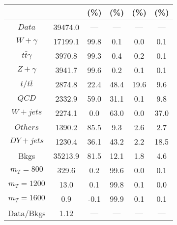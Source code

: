 \begin{figure}
\begin{minipage}[c]{0.32\textwidth}
{\begin{tabular}{cccccc}
 &  & (\%) & (\%) & (\%) & (\%)  \\
\hline
                                                                      $ Data $ &  39474.0 &  --- &  --- &  --- &  ---\\
$ W+\gamma $ &  17199.1 &  99.8 &  0.1 &  0.0 &  0.1\\
$ t\bar{t}\gamma $ &  3970.8 &  99.3 &  0.4 &  0.2 &  0.1\\
$ Z+\gamma $ &  3941.7 &  99.6 &  0.2 &  0.1 &  0.1\\
$ t/t\bar{t} $ &  2874.8 &  22.4 &  48.4 &  19.6 &  9.6\\
$ QCD $ &  2332.9 &  59.0 &  31.1 &  0.1 &  9.8\\
$ W+jets $ &  2274.1 &  0.0 &  63.0 &  0.0 &  37.0\\
$ Others $ &  1390.2 &  85.5 &  9.3 &  2.6 &  2.7\\
$ DY+jets $ &  1230.4 &  36.1 &  43.2 &  2.2 &  18.5\\
Bkgs &  35213.9 &  81.5 &  12.1 &  1.8 &  4.6\\
$ m_{T} = 800 $ &  329.6 &  0.2 &  99.6 &  0.0 &  0.1\\
$ m_{T} = 1200 $ &  13.0 &  0.1 &  99.8 &  0.1 &  0.0\\
$ m_{T} = 1600 $ &  0.9 &  -0.1 &  99.9 &  0.1 &  0.1\\
Data/Bkgs &  1.12 &  --- &  --- &  --- &  ---\\
\hline
\end{tabular}
}
\end{minipage}
\end{figure}

